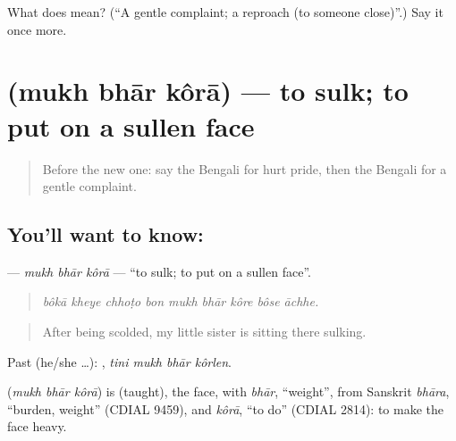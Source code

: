 \begin{tcolorbox}[breakable,colback=teal!4,colframe=teal!35!black,title={Before you move on}]
What does  mean? (\textquotedblleft{}A gentle complaint; a reproach (to someone close)\textquotedblright{}.) Say it once more.
\end{tcolorbox}
\section[\texorpdfstring{\bn{মুখ} \bn{ভার} \bn{করা} (mukh bhār kôrā)}{মুখ ভার করা (mukh bhār kôrā)}]{   (mukh bhār kôrā) — to sulk; to put on a sullen face}

\label{lesson:BN-C444-mukh-bhar-kora}



\begin{quote}
Before the new one: say the Bengali for hurt pride, then the Bengali for a gentle complaint.
\end{quote}

\subsection*{You'll want to know:   }
\textbf{  } — \emph{mukh bhār kôrā} — \textquotedblleft{}to sulk; to put on a sullen face\textquotedblright{}.

\begin{quote}
        
\end{quote}

\begin{quote}
\emph{bôkā kheye chhoṭo bon mukh bhār kôre bôse āchhe.}
\end{quote}

\begin{quote}
After being scolded, my little sister is sitting there sulking.
\end{quote}

Past (he/she …):    , \emph{tini mukh bhār kôrlen}.

\begin{cousinweb}
\textbf{  } (\emph{mukh bhār kôrā}) is  (taught), the face, with \emph{bhār}, \textquotedblleft{}weight\textquotedblright{}, from Sanskrit \emph{bhāra}, \textquotedblleft{}burden, weight\textquotedblright{} (CDIAL 9459), and \emph{kôrā}, \textquotedblleft{}to do\textquotedblright{} (CDIAL 2814): to make the face heavy.
\end{cousinweb}

